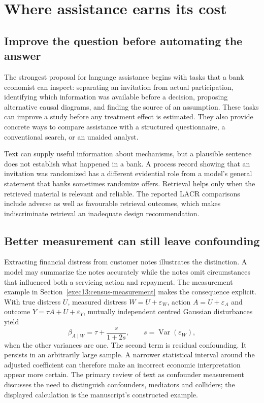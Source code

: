 \chapter{Where assistance earns its cost}
\label{reading:assistance-conclusions}

\section{Improve the question before automating the answer}

The strongest proposal for language assistance begins with tasks that a bank
economist can inspect: separating an invitation from actual participation,
identifying which information was available before a decision, proposing
alternative causal diagrams, and finding the source of an assumption. These
tasks can improve a study before any treatment effect is estimated. They also
provide concrete ways to compare assistance with a structured questionnaire,
a conventional search, or an unaided analyst.\citep{v12_la_2305_00050,v12_la_2606_23608}

Text can supply useful information about mechanisms, but a plausible sentence
does not establish what happened in a bank. A process record showing that an
invitation was randomized has a different evidential role from a model's
general statement that banks sometimes randomize offers. Retrieval helps only
when the retrieved material is relevant and reliable. The reported LACR
comparisons include adverse as well as favourable retrieval outcomes, which
makes indiscriminate retrieval an inadequate design recommendation.
\citep{v12_la_2402_15301}

\section{Better measurement can still leave confounding}

Extracting financial distress from customer notes illustrates the distinction.
A model may summarize the notes accurately while the notes omit circumstances
that influenced both a servicing action and repayment. The measurement example
in Section~\ref{exec13:census-measurement} makes the consequence explicit.
With true distress $U$, measured distress $W=U+\varepsilon_W$, action
$A=U+\varepsilon_A$ and outcome $Y=\tau A+U+\varepsilon_Y$, mutually
independent centred Gaussian disturbances yield
\[
 \beta_{A\mid W}=\tau+\frac{s}{1+2s},\qquad
 s=\operatorname{Var}(\varepsilon_W),
\]
when the other variances are one. The second term is residual confounding.
It persists in an arbitrarily large sample. A narrower statistical interval
around the adjusted coefficient can therefore make an incorrect economic
interpretation appear more certain. The primary review of text as confounder
measurement discusses the need to distinguish confounders, mediators and
colliders; the displayed calculation is the manuscript's constructed example.
\citep{exec13_census_text_review_arxiv}

